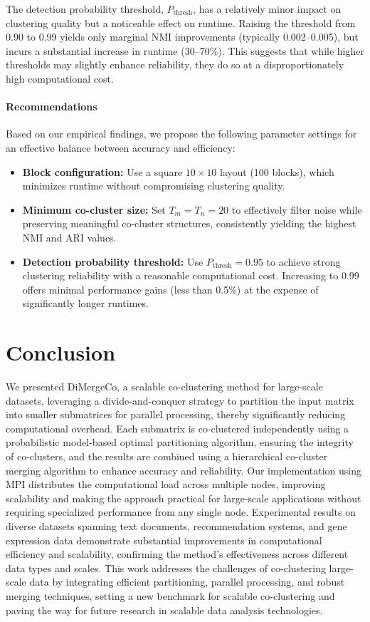 \documentclass[journal]{IEEEtran}
\theoremstyle{definition}
\theoremstyle{remark} %
\begin{document}
{The detection probability threshold, $P_{\text{thresh}}$, has a relatively minor impact on clustering quality but a noticeable effect on runtime. Raising the threshold from 0.90 to 0.99 yields only marginal NMI improvements (typically 0.002--0.005), but incurs a substantial increase in runtime (30--70\%). This suggests that while higher thresholds may slightly enhance reliability, they do so at a disproportionately high computational cost.

\paragraph{Recommendations}
Based on our empirical findings, we propose the following parameter settings for an effective balance between accuracy and efficiency:
\begin{itemize}
    \item \textbf{Block configuration:} Use a square $10 \times 10$ layout (100 blocks), which minimizes runtime without compromising clustering quality.
    \item \textbf{Minimum co-cluster size:} Set $T_m = T_n = 20$ to effectively filter noise while preserving meaningful co-cluster structures, consistently yielding the highest NMI and ARI values.
    \item \textbf{Detection probability threshold:} Use $P_{\text{thresh}} = 0.95$ to achieve strong clustering reliability with a reasonable computational cost. Increasing to 0.99 offers minimal performance gains (less than 0.5\%) at the expense of significantly longer runtimes.
\end{itemize}
}

\section{Conclusion}
\label{sec:conclusion}
We presented DiMergeCo, a scalable co-clustering method for large-scale datasets, leveraging a divide-and-conquer strategy to partition the input matrix into smaller submatrices for parallel processing, thereby significantly reducing computational overhead. Each submatrix is co-clustered independently using a probabilistic model-based optimal partitioning algorithm, ensuring the integrity of co-clusters, and the results are combined using a hierarchical co-cluster merging algorithm to enhance accuracy and reliability. Our implementation using MPI distributes the computational load across multiple nodes, improving scalability and making the approach practical for large-scale applications without requiring specialized performance from any single node. {\color{blue}Experimental results on diverse datasets spanning text documents, recommendation systems, and gene expression data demonstrate substantial improvements in computational efficiency and scalability, confirming the method's effectiveness across different data types and scales.} This work addresses the challenges of co-clustering large-scale data by integrating efficient partitioning, parallel processing, and robust merging techniques, setting a new benchmark for scalable co-clustering and paving the way for future research in scalable data analysis technologies.

\printbibliography
\end{document}
